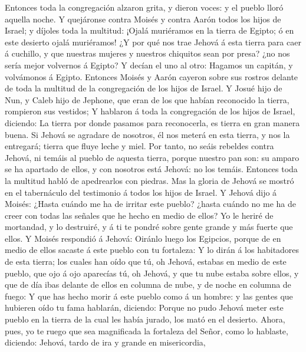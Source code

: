  Entonces toda la congregación alzaron grita, y dieron
voces: y el pueblo lloró aquella noche.  Y quejáronse
contra Moisés y contra Aarón todos los hijos de Israel; y díjoles toda
la multitud: ¡Ojalá muriéramos en la tierra de Egipto; ó en este
desierto ojalá muriéramos!  ¿Y por qué nos trae Jehová á
esta tierra para caer á cuchillo, y que nuestras mujeres y nuestros
chiquitos sean por presa? ¿no nos sería mejor volvernos á Egipto?
 Y decían el uno al otro: Hagamos un capitán, y volvámonos
á Egipto.  Entonces Moisés y Aarón cayeron sobre sus
rostros delante de toda la multitud de la congregación de los hijos de
Israel.  Y Josué hijo de Nun, y Caleb hijo de Jephone, que
eran de los que habían reconocido la tierra, rompieron sus vestidos;
 Y hablaron á toda la congregación de los hijos de Israel,
diciendo: La tierra por donde pasamos para reconocerla, es tierra en
gran manera buena.  Si Jehová se agradare de nosotros, él
nos meterá en esta tierra, y nos la entregará; tierra que fluye leche y
miel.  Por tanto, no seáis rebeldes contra Jehová, ni
temáis al pueblo de aquesta tierra, porque nuestro pan son: su amparo se
ha apartado de ellos, y con nosotros está Jehová: no los temáis.
 Entonces toda la multitud habló de apedrearlos con
piedras. Mas la gloria de Jehová se mostró en el tabernáculo del
testimonio á todos los hijos de Israel.  Y Jehová dijo á
Moisés: ¿Hasta cuándo me ha de irritar este pueblo? ¿hasta cuándo no me
ha de creer con todas las señales que he hecho en medio de ellos?
 Yo le heriré de mortandad, y lo destruiré, y á ti te
pondré sobre gente grande y más fuerte que ellos.  Y
Moisés respondió á Jehová: Oiránlo luego los Egipcios, porque de en
medio de ellos sacaste á este pueblo con tu fortaleza:  Y
lo dirán á los habitadores de esta tierra; los cuales han oído que tú,
oh Jehová, estabas en medio de este pueblo, que ojo á ojo aparecías tú,
oh Jehová, y que tu nube estaba sobre ellos, y que de día ibas delante
de ellos en columna de nube, y de noche en columna de fuego:
 Y que has hecho morir á este pueblo como á un hombre: y
las gentes que hubieren oído tu fama hablarán, diciendo: 
Porque no pudo Jehová meter este pueblo en la tierra de la cual les
había jurado, los mató en el desierto.  Ahora, pues, yo
te ruego que sea magnificada la fortaleza del Señor, como lo hablaste,
diciendo:  Jehová, tardo de ira y grande en misericordia,
